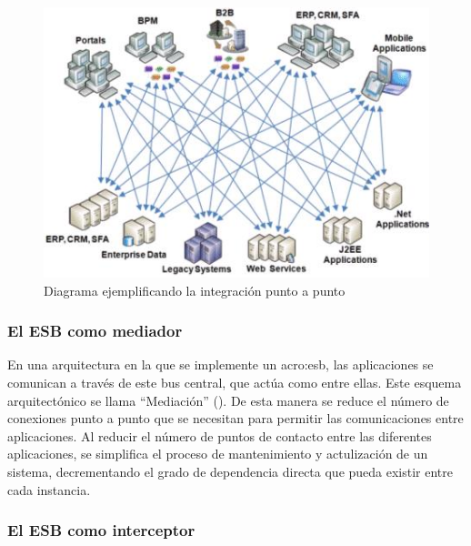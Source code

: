 \begin{figure}[H]
  \includegraphics[width=\linewidth]{src/images/03-capitulo-3/tecnologias/esb/point-to-point-integration.png}
  \caption{Diagrama ejemplificando la integración punto a punto}
  \label{fig:point-to-point-integration}
\end{figure}


\subsubsection{El ESB como mediador}


En una arquitectura en la que se implemente un \gls{acro:esb}, las aplicaciones se comunican a través de este bus central, que actúa como  entre ellas. Este esquema arquitectónico se llama ``Mediación'' (). De esta manera se reduce el número de conexiones punto a punto que se necesitan para permitir las comunicaciones entre aplicaciones. Al reducir el número de puntos de contacto entre las diferentes aplicaciones, se simplifica el proceso de mantenimiento y actulización de un sistema, decrementando el grado de dependencia directa que pueda existir entre cada instancia.


\subsubsection{El ESB como interceptor}

